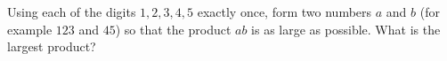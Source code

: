 Using each of the digits $1,2,3,4,5$ exactly once, form two numbers $a$ and $b$ (for example $123$ and $45$) so that the product $ab$ is as large as possible. What is the largest product?
